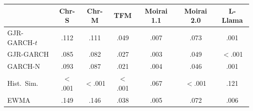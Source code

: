 \begin{tabular}{@{}lcccccc@{}}
\toprule
& Chr-S & Chr-M & TFM & Moirai 1.1 & Moirai 2.0 & L-Llama \\
\midrule
GJR-GARCH-$t$    & .112 & .111 & .049 & .007 & .073 & .001 \\
GJR-GARCH        & .085 & .082 & .027 & .003 & .049 & $<$.001 \\
GARCH-N          & .093 & .087 & .021 & .004 & .046 & .001 \\
Hist.\ Sim.      & $<$.001 & $<$.001 & $<$.001 & .067 & $<$.001 & .121 \\
EWMA             & .149 & .146 & .038 & .005 & .072 & .006 \\
\bottomrule
\end{tabular}
